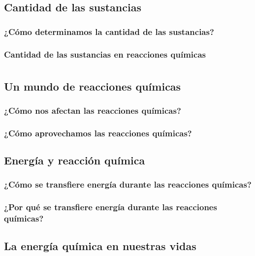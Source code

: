 \documentclass[11pt]{book}
\begin{document}
\newpage \thispagestyle{plain}
\section{Cantidad de las sustancias}
\subsection{¿Cómo determinamos la cantidad de las sustancias?}
\subsection{Cantidad de las sustancias en reacciones químicas}

\newpage
\chapter{}

\newpage \thispagestyle{plain}
\section{Un mundo de reacciones químicas}
\subsection{¿Cómo nos afectan las reacciones químicas?}
\subsection{¿Cómo aprovechamos las reacciones químicas?}

\newpage \thispagestyle{plain}
\section{Energía y reacción química}
\subsection{¿Cómo se transfiere energía durante las reacciones químicas?}
\subsection{¿Por qué se transfiere energía durante las reacciones químicas?}

\newpage \thispagestyle{plain}
\section{La energía química en nuestras vidas}
\end{document}
